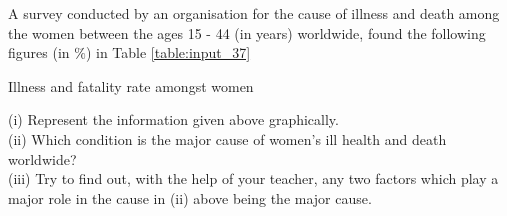  A survey conducted by an organisation for the cause of illness and death among the women between the ages 15 - 44 (in years) worldwide, found the following figures (in $\%$) in Table \ref{table:input_37}

\begin{table}[ht!]
\centering

\caption{Illness and fatality rate amongst women}
\label{table:input_37}
\end{table}
(i) Represent the information given above graphically.\\
(ii) Which condition is the major cause of women’s ill health and death worldwide?\\
(iii) Try to find out, with the help of your teacher, any two factors which play a major role in the cause in (ii) above being the major cause.\\
